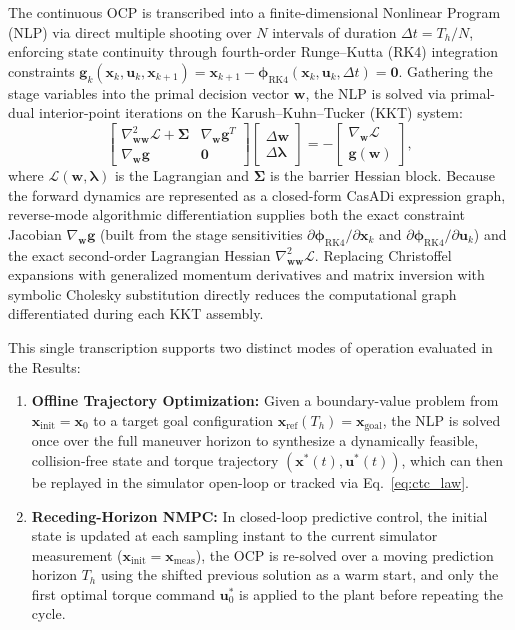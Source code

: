 \documentclass[fleqn,10pt]{article}
\begin{document}
The continuous OCP is transcribed into a finite-dimensional Nonlinear Program (NLP) via direct multiple shooting over $N$ intervals of duration $\Delta t = T_h / N$, enforcing state continuity through fourth-order Runge--Kutta (RK4) integration constraints $\bm{g}_k(\bm{x}_k, \bm{u}_k, \bm{x}_{k+1}) = \bm{x}_{k+1} - \bm{\phi}_{\text{RK4}}(\bm{x}_k, \bm{u}_k, \Delta t) = \bm{0}$. Gathering the stage variables into the primal decision vector $\bm{w}$, the NLP is solved via primal-dual interior-point iterations on the Karush--Kuhn--Tucker (KKT) system:
\begin{equation}
	\begin{bmatrix} \nabla_{\bm{w}\bm{w}}^2 \mathcal{L} + \bm{\Sigma} & \nabla_{\bm{w}} \bm{g}^T \\ \nabla_{\bm{w}} \bm{g} & \bm{0} \end{bmatrix} \begin{bmatrix} \Delta \bm{w} \\ \Delta \bm{\lambda} \end{bmatrix} = - \begin{bmatrix} \nabla_{\bm{w}} \mathcal{L} \\ \bm{g}(\bm{w}) \end{bmatrix},
	\label{eq:kkt_system}
\end{equation}
where $\mathcal{L}(\bm{w}, \bm{\lambda})$ is the Lagrangian and $\bm{\Sigma}$ is the barrier Hessian block. Because the forward dynamics are represented as a closed-form CasADi expression graph, reverse-mode algorithmic differentiation supplies both the exact constraint Jacobian $\nabla_{\bm{w}}\bm{g}$ (built from the stage sensitivities $\partial \bm{\phi}_{\text{RK4}}/\partial \bm{x}_k$ and $\partial \bm{\phi}_{\text{RK4}}/\partial \bm{u}_k$) and the exact second-order Lagrangian Hessian $\nabla_{\bm{w}\bm{w}}^2 \mathcal{L}$. Replacing Christoffel expansions with generalized momentum derivatives and matrix inversion with symbolic Cholesky substitution directly reduces the computational graph differentiated during each KKT assembly.

This single transcription supports two distinct modes of operation evaluated in the Results:
\begin{enumerate}
	\item \textbf{Offline Trajectory Optimization:} Given a boundary-value problem from $\bm{x}_{\text{init}} = \bm{x}_0$ to a target goal configuration $\bm{x}_{\text{ref}}(T_h) = \bm{x}_{\text{goal}}$, the NLP is solved once over the full maneuver horizon to synthesize a dynamically feasible, collision-free state and torque trajectory $(\bm{x}^*(t), \bm{u}^*(t))$, which can then be replayed in the simulator open-loop or tracked via Eq.~\eqref{eq:ctc_law}.
	\item \textbf{Receding-Horizon NMPC:} In closed-loop predictive control, the initial state is updated at each sampling instant to the current simulator measurement ($\bm{x}_{\text{init}} = \bm{x}_{\text{meas}}$), the OCP is re-solved over a moving prediction horizon $T_h$ using the shifted previous solution as a warm start, and only the first optimal torque command $\bm{u}_0^*$ is applied to the plant before repeating the cycle.
\end{enumerate}
\end{document}
